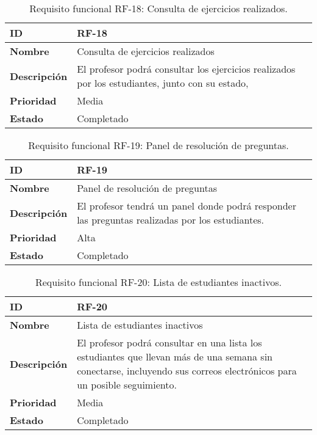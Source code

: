 \begin{table}[H]
    \centering
    \begin{tabular}{|l|p{9.5cm}|}
        \hline
        \textbf{ID} & RF-18 \\
        \hline
        \textbf{Nombre} & Consulta de ejercicios realizados \\
        \hline
        \textbf{Descripción} & El profesor podrá consultar los ejercicios realizados por los estudiantes, junto con su estado, \\
        \hline
        \textbf{Prioridad} & Media \\
        \hline
        \textbf{Estado} & Completado \\
        \hline
    \end{tabular}
    \caption{Requisito funcional RF-18: Consulta de ejercicios realizados.}
    \label{table:req-RF00G}
\end{table}


\begin{table}[H]
    \centering
    \begin{tabular}{|l|p{9.5cm}|}
        \hline
        \textbf{ID} & RF-19 \\
        \hline
        \textbf{Nombre} & Panel de resolución de preguntas \\
        \hline
        \textbf{Descripción} & El profesor tendrá un panel donde podrá responder las preguntas realizadas por los estudiantes. \\
        \hline
        \textbf{Prioridad} & Alta \\
        \hline
        \textbf{Estado} & Completado \\
        \hline
    \end{tabular}
    \caption{Requisito funcional RF-19: Panel de resolución de preguntas.}
    \label{table:req-RF00H}
\end{table}

\begin{table}[H]
    \centering
    \begin{tabular}{|l|p{9.5cm}|}
        \hline
        \textbf{ID} & RF-20 \\
        \hline
        \textbf{Nombre} & Lista de estudiantes inactivos \\
        \hline
        \textbf{Descripción} & El profesor podrá consultar en una lista los estudiantes que llevan más de una semana sin conectarse, incluyendo sus correos electrónicos para un posible seguimiento. \\
        \hline
        \textbf{Prioridad} & Media \\
        \hline
        \textbf{Estado} & Completado \\
        \hline
    \end{tabular}
    \caption{Requisito funcional RF-20: Lista de estudiantes inactivos.}
    \label{table:req-RF00I}
\end{table}

